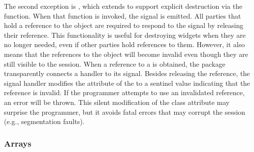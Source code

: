 \documentclass[article,shortnames]{jss}
\begin{document}
The second exception is , which extends 
to support explicit destruction via the 
function. When that function is invoked, the  signal is
emitted. All parties that hold a reference to the object are required
to respond to the signal by releasing their reference. This
functionality is useful for destroying widgets when they are no longer
needed, even if other parties hold references to them. However, it
also means that the  references to the object will become
invalid even though they are still visible to the 
session. When a reference to a  is obtained, the
 package transparently connects a handler to its
 signal.
Besides releasing the reference, the signal handler modifies the
 attribute of the  to a sentinel value
indicating that the reference is invalid.  If the programmer attempts
to use an invalidated reference, an error will be thrown.  This silent
modification of the class attribute may surprise the 
programmer, but it avoids fatal errors that may corrupt the
 session
(e.g., segmentation faults).

\subsubsection{Arrays}
\end{document}
